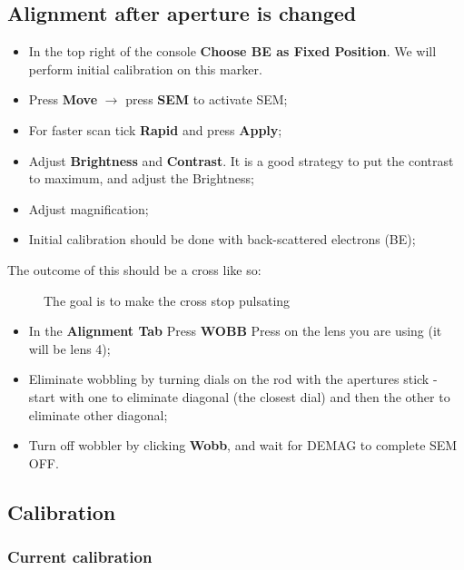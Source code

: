 \subsection{Alignment after aperture is changed}
\label{Alignment}

\begin{itemize}
\item In the top  right of the console \textbf{Choose BE  as Fixed Position}. We
  will perform initial calibration on this marker.
\item Press \textbf{Move} $\rightarrow$ press \textbf{SEM} to activate SEM;
\item For faster scan tick \textbf{Rapid} and press \textbf{Apply};
\item Adjust \textbf{Brightness}  and \textbf{Contrast}.  It is  a good strategy
  to put the contrast to maximum, and adjust the Brightness;
\item Adjust magnification;
\item Initial calibration should be done with back-scattered electrons (BE);
\end{itemize}

The outcome of this should be a cross like so:

\begin{figure}[h]
  \centering {}
  \caption{\small     The    goal     is    to     make    the     cross    stop
    pulsating\label{fig:jeol_cross_be}}
\end{figure}

\begin{itemize}
\item In the  \textbf{Alignment Tab} Press \textbf{WOBB} \ira Press  on the lens
  you are using (it will be lens 4);
\item Eliminate wobbling by turning dials on  the rod with the apertures stick -
  start with one to eliminate diagonal (the  closest dial) and then the other to
  eliminate  other  diagonal;  
\item Turn off wobbler by clicking \textbf{Wobb}, and wait for DEMAG to complete
  \ira SEM OFF.
\end{itemize}

\subsection{Calibration}

\subsubsection{Current calibration}
\label{sec:current-calibration}

